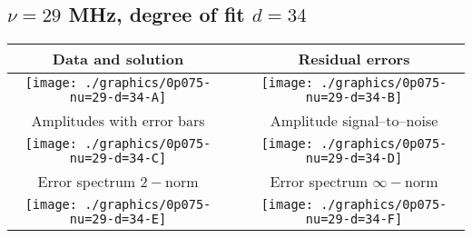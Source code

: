 

% 

\clearpage{}
\break{}

\subsection{$\nu = 29$ MHz, degree of fit $d = 34$}

\begin{table}[h]
    \begin{center}
        \begin{tabular}{ccc}
            Data and solution & \quad & Residual errors \\\hline
            \texttt{[image: ./graphics/0p075-nu=29-d=34-A]} &&
            \texttt{[image: ./graphics/0p075-nu=29-d=34-B]} \\[15pt]
            Amplitudes with error bars && Amplitude signal--to--noise \\\hline
            \texttt{[image: ./graphics/0p075-nu=29-d=34-C]} &&
            \texttt{[image: ./graphics/0p075-nu=29-d=34-D]} \\[15pt]
            Error spectrum $2-$norm && Error spectrum $\infty-$norm \\\hline
            \texttt{[image: ./graphics/0p075-nu=29-d=34-E]} &&
            \texttt{[image: ./graphics/0p075-nu=29-d=34-F]} \\[15pt]
        \end{tabular}
    \end{center}
\label{fig:elev=75, nu=29}
\end{table}



\endinput
